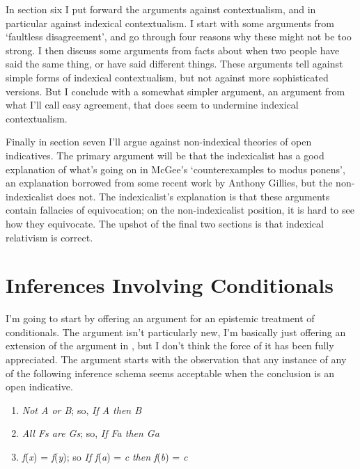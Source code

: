 In section six I put forward the arguments against contextualism, and in particular against indexical contextualism. I start with some arguments from `faultless disagreement', and go through four reasons why these might not be too strong. I then discuss some arguments from facts about when two people have said the same thing, or have said different things. These arguments tell against simple forms of indexical contextualism, but not against more sophisticated versions. But I conclude with a somewhat simpler argument, an argument from what I'll call easy agreement, that does seem to undermine indexical contextualism.

Finally in section seven I'll argue against non-indexical theories of open indicatives. The primary argument will be that the indexicalist has a good explanation of what's going on in McGee's `counterexamples to modus ponens', an explanation borrowed from some recent work by Anthony Gillies, but the non-indexicalist does not. The indexicalist's explanation is that these arguments contain fallacies of equivocation; on the non-indexicalist position, it is hard to see how they equivocate. The upshot of the final two sections is that indexical relativism is correct.


\section{Inferences Involving Conditionals}

I'm going to start by offering an argument for an epistemic treatment of conditionals. The argument isn't particularly new, I'm basically just offering an extension of the argument in \citet{Stalnaker1975-STAIC}, but I don't think the force of it has been fully appreciated. The argument starts with the observation that any instance of any of the following inference schema seems acceptable when the conclusion is an open indicative.

\renewcommand{\labelenumi}{(1.\arabic{enumi})}
\begin{enumerate}
\setcounter{enumi}{0}
\item \textit{Not A or B}; so, \textit{If A then B}

\item \textit{All Fs are Gs}; so, \textit{If Fa then Ga}

\item \textit{f}(\textit{x}) = \textit{f}(\textit{y}); so \textit{If f}(\textit{a}) = \textit{c} \textit{then f}(\textit{b}) = \textit{c}
\end{enumerate}

